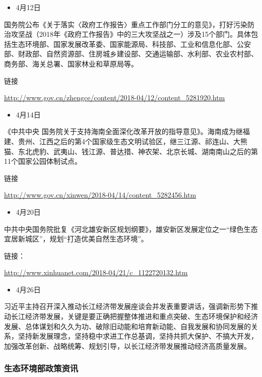 \documentclass[]{book}
\providecommand{\tightlist}{%
  \setlength{\itemsep}{0pt}\setlength{\parskip}{0pt}}
\begin{document}
\begin{itemize}
\tightlist
\item
  4月12日
\end{itemize}

国务院公布《关于落实〈政府工作报告〉重点工作部门分工的意见》，打好污染防治攻坚战（2018年《政府工作报告》中的三大攻坚战之一）涉及15个部门。具体包括生态环境部、国家发展改革委、国家能源局、科技部、工业和信息化部、公安部、财政部、自然资源部、住房城乡建设部、交通运输部、水利部、农业农村部、商务部、海关总署、国家林业和草原局等。

链接

\url{http://www.gov.cn/zhengce/content/2018-04/12/content_5281920.htm}

\begin{itemize}
\tightlist
\item
  4月14日
\end{itemize}

《中共中央
国务院关于支持海南全面深化改革开放的指导意见》。海南成为继福建、贵州、江西之后的第4个国家级生态文明试验区，继三江源、祁连山、大熊猫、东北虎豹、武夷山、钱江源、普达措、神农架、北京长城、湖南南山之后的第11个国家公园体制试点。

链接

\url{http://www.gov.cn/xinwen/2018-04/14/content_5282456.htm}

\begin{itemize}
\tightlist
\item
  4月20日
\end{itemize}

中共中央国务院批复《河北雄安新区规划纲要》，雄安新区发展定位之一``绿色生态宜居新城区''，规划``打造优美自然生态环境''。

链接：

\url{http://www.xinhuanet.com/2018-04/21/c_1122720132.htm}

\begin{itemize}
\tightlist
\item
  4月26日
\end{itemize}

习近平主持召开深入推动长江经济带发展座谈会并发表重要讲话，强调新形势下推动长江经济带发展，关键是要正确把握整体推进和重点突破、生态环境保护和经济发展、总体谋划和久久为功、破除旧动能和培育新动能、自我发展和协同发展的关系，坚持新发展理念，坚持稳中求进工作总基调，坚持共抓大保护、不搞大开发，加强改革创新、战略统筹、规划引导，以长江经济带发展推动经济高质量发展。

\subsubsection*{生态环境部政策资讯}
\end{document}
